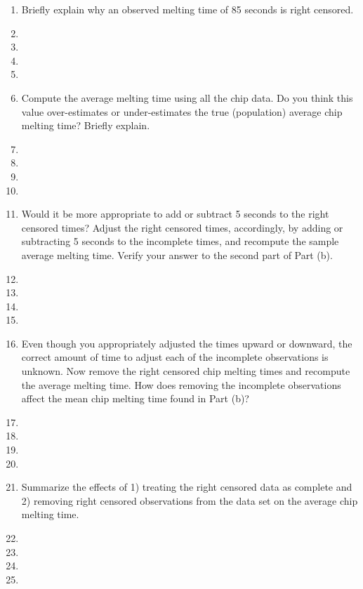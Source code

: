 \begin{enumerate}
\begin{enumerate}
\item Briefly explain why an observed melting time of 85 seconds is right censored.
\item[]
\item[]
\item[]
\item[]
\item Compute the average melting time using all the chip data.  Do you think this value over-estimates or under-estimates the true (population) average chip melting time?  Briefly explain.
\item[]
\item[]
\item[]
\item[]
\item Would it be more appropriate to add or subtract 5 seconds to the right censored times?  Adjust the right censored times, accordingly, by adding or subtracting 5 seconds to the incomplete times, and recompute the sample average melting time.  Verify your answer to the second part of Part (b).
\item[]
\item[]
\item[]
\item[]
\item Even though you appropriately adjusted the times upward or downward, the correct amount of time to adjust each of the incomplete observations is unknown. Now remove the right censored chip melting times and recompute the average melting time.  How does removing the incomplete observations affect the mean chip melting time found in Part (b)?
\item[]
\item[]
\item[]
\item[]
\item Summarize the effects of 1) treating the right censored data as complete and 2) removing right censored observations from the data set on the average chip melting time.
\item[]
\item[]
\item[]
\item[]
\end{enumerate}


\end{enumerate}

